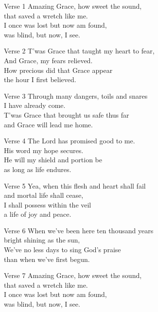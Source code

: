 \documentclass{beamer}
\begin{document}
\begin{frame}{Verse 1}
 \huge{
    \centering
    Amazing Grace, how sweet the sound, \\
    that saved a wretch like me. \\
    I once was lost but now am found, \\
    was blind, but now, I see. \\
}
\end{frame}

\begin{frame}{Verse 2}
 \huge{
    \centering
    T'was Grace that taught my heart to fear, \\
    And Grace, my fears relieved. \\
    How precious did that Grace appear \\
    the hour I first believed. \\
}
\end{frame}

\begin{frame}{Verse 3}
 \huge{
    \centering
    Through many dangers, toils and snares \\
    I have already come. \\
    T'was Grace that brought us safe thus far \\
    and Grace will lead me home. \\
}
\end{frame}

\begin{frame}{Verse 4}
 \huge{
    \centering
    The Lord has promised good to me. \\
    His word my hope secures. \\
    He will my shield and portion be \\
    as long as life endures. \\
}
\end{frame}

\begin{frame}{Verse 5}
 \huge{
    \centering
    Yea, when this flesh and heart shall fail \\
    and mortal life shall cease, \\
    I shall possess within the veil \\
    a life of joy and peace. \\
}
\end{frame}

\begin{frame}{Verse 6}
 \huge{
    \centering
    When we've been here ten thousand years \\
    bright shining as the sun, \\
    We've no less days to sing God's praise \\
    than when we've first begun. \\
}
\end{frame}

\begin{frame}{Verse 7}
 \huge{
    \centering
    Amazing Grace, how sweet the sound, \\
    that saved a wretch like me. \\
    I once was lost but now am found, \\
    was blind, but now, I see. \\
}
\end{frame}
\end{document}
